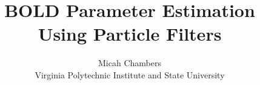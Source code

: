 \documentclass{report}
\numberwithin{algorithm}{chapter}
\begin{document}
\title{BOLD Parameter Estimation Using Particle Filters}
\author{Micah Chambers\\Virginia Polytechnic Institute and State University}
\date{}
\maketitle

\tableofcontents









%
%
%

\end{document}
